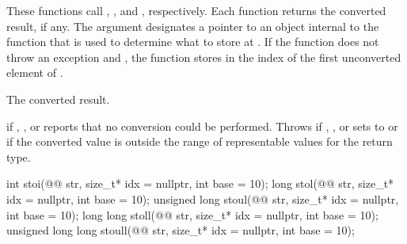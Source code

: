 \documentclass[ebook,11pt,article]{memoir}
\begin{document}
\begin{itemdescr}
\pnum
\effects {} These functions call
, , and
, respectively. Each function returns
the converted result, if any. The argument  designates a pointer to
an object internal to the function that is used to determine what to store at
. If the function does not throw an exception and ,
the function stores in  the index of the first unconverted element
of .

\pnum
\returns The converted result.

\pnum
\throws {} if , , or
 reports that no conversion could be performed. Throws
 if , , or
 sets  to 
or if the converted value is outside the range of representable
values for the return type.
\end{itemdescr}

%
%
%
%
%
\begin{itemdecl}
int stoi(@@ str, size_t* idx = nullptr, int base = 10);
long stol(@@ str, size_t* idx = nullptr, int base = 10);
unsigned long stoul(@@ str, size_t* idx = nullptr, int base = 10);
long long stoll(@@ str, size_t* idx = nullptr, int base = 10);
unsigned long long stoull(@@ str, size_t* idx = nullptr, int base = 10);
\end{itemdecl}
\end{document}
